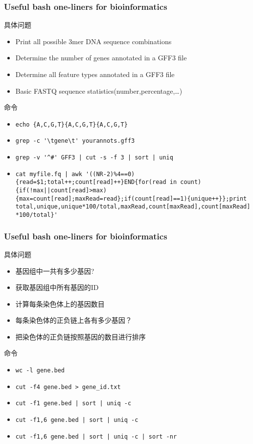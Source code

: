 \begin{frame}[fragile]
  \frametitle{Useful bash one-liners for bioinformatics}
  \begin{block}{具体问题}
    \begin{itemize}
      \item<2-> Print all possible 3mer DNA sequence combinations
      \item<4-> Determine the number of genes annotated in a GFF3 file
      \item<6-> Determine all feature types annotated in a GFF3 file
      \item<8-> Basic FASTQ sequence statistics(number,percentage,\ldots)
    \end{itemize}
  \end{block}
  \begin{block}{命令}
    \begin{itemize}
      \item<3-> \verb=echo {A,C,G,T}{A,C,G,T}{A,C,G,T}=
      \item<5-> \verb|grep -c '\tgene\t' yourannots.gff3|
      \item<7-> \verb~grep -v '^#' GFF3 | cut -s -f 3 | sort | uniq~
      \item<9-> {\tiny \verb~cat myfile.fq | awk '((NR-2)%4==0){read=$1;total++;count[read]++}END{for(read in count){if(!max||count[read]>max) {max=count[read];maxRead=read};if(count[read]==1){unique++}};print total,unique,unique*100/total,maxRead,count[maxRead],count[maxRead]*100/total}'~}
    \end{itemize}
  \end{block}
\end{frame}

\begin{frame}[fragile]
  \frametitle{\alert{Useful bash one-liners for bioinformatics}}
  \begin{block}{具体问题}
    \begin{itemize}
      \item<2-> 基因组中一共有多少基因?
      \item<4-> 获取基因组中所有基因的ID
      \item<6-> 计算每条染色体上的基因数目
      \item<8-> 每条染色体的正负链上各有多少基因？
      \item<10-> 把染色体的正负链按照基因的数目进行排序
    \end{itemize}
  \end{block}
  \begin{block}{命令}
    \begin{itemize}
      \item<3-> \verb=wc -l gene.bed=
      \item<5-> \verb|cut -f4 gene.bed > gene_id.txt|
      \item<7-> \verb=cut -f1 gene.bed | sort | uniq -c=
      \item<9-> \verb=cut -f1,6 gene.bed | sort | uniq -c=
      \item<11-> \verb=cut -f1,6 gene.bed | sort | uniq -c | sort -nr=
    \end{itemize}
  \end{block}
\end{frame}


